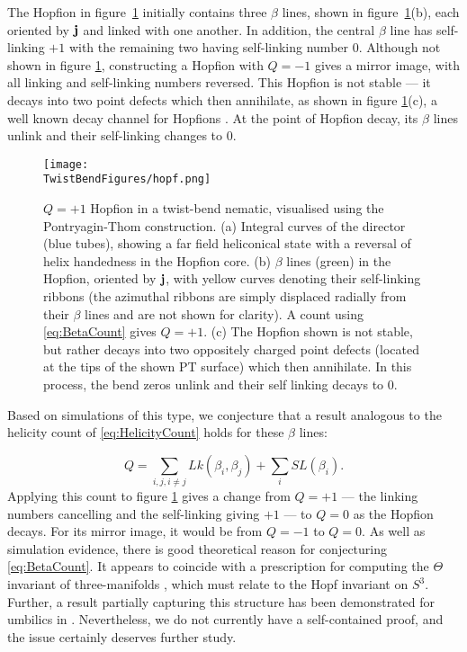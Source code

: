 {The Hopfion in figure~\ref{fig:Hopf} initially contains three $\beta$ lines, shown in figure~\ref{fig:Hopf}(b), each oriented by $\mathbf{j}$ and linked with one another. In addition, the central $\beta$ line has self-linking $+1$ with the remaining two having self-linking number $0$. Although not shown in figure \ref{fig:Hopf}, constructing a Hopfion with $Q=-1$ gives a mirror image, with all linking and self-linking numbers reversed. This Hopfion is not stable --- it decays into two point defects which then annihilate, as shown in figure \ref{fig:Hopf}(c), a well known decay channel for Hopfions \citep{Chuang1991}. At the point of Hopfion decay, its $\beta$ lines unlink and their self-linking changes to $0$.
\begin{figure}[htbp]
    \centering
    \texttt{[image: \\TwistBendFigures/hopf.png]}
    \caption{$Q=+1$ Hopfion in a twist-bend nematic, visualised using the Pontryagin-Thom construction. (a) Integral curves of the director (blue tubes), showing a far field heliconical state with a reversal of helix handedness in the Hopfion core. (b) $\beta$ lines (green) in the Hopfion, oriented by $\mathbf{j}$, with yellow curves denoting their self-linking ribbons (the azimuthal ribbons are simply displaced radially from their $\beta$ lines and are not shown for clarity). A count using \eqref{eq:BetaCount} gives $Q=+1$. (c) The Hopfion shown is not stable, but rather decays into two oppositely charged point defects (located at the tips of the shown PT surface) which then annihilate. In this process, the bend zeros unlink and their self linking decays to $0$.}
    \label{fig:Hopf}
\end{figure}

Based on simulations of this type, we conjecture that a result analogous to the helicity count of \eqref{eq:HelicityCount} holds for these $\beta$ lines:

\begin{equation}
    Q = \sum_{i,j, i\neq j}Lk(\beta_i,\beta_j) + \sum_{i} SL(\beta_i). 
    \label{eq:BetaCount}
\end{equation}
Applying this count to figure \ref{fig:Hopf} gives a change from $Q=+1$ --- the linking numbers cancelling and the self-linking giving $+1$ --- to $Q=0$ as the Hopfion decays. For its mirror image, it would be from $Q=-1$ to $Q=0$. As well as simulation evidence, there  is good theoretical reason for conjecturing \eqref{eq:BetaCount}. It appears to coincide with a prescription for computing the $\Theta$ invariant of three-manifolds \citep{Gompf1998}, which must relate to the Hopf invariant on $S^3$. Further, a result partially capturing this structure has been demonstrated for umbilics in \citep{Machon2016b}. Nevertheless, we do not currently have a self-contained proof, and the issue certainly deserves further study. 

}
